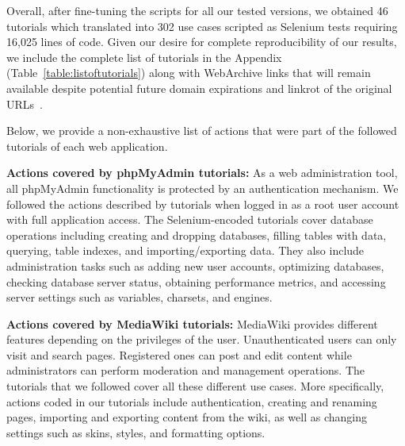 Overall, after fine-tuning the scripts for all our tested versions, we obtained
46 tutorials which translated into 302 use cases scripted as Selenium tests
requiring 16,025 lines of code. Given our desire for complete reproducibility
of our results, we include the complete list of tutorials in the Appendix
(Table~\ref{table:listoftutorials}) along with WebArchive links that will
remain available despite potential future domain expirations and linkrot of
the original URLs~\cite{koehler2004longitudinal}.


Below, we provide a non-exhaustive list of actions that were part of the followed tutorials of each web application. 
\vspace{0.5ex}

\noindent \textbf{Actions covered by phpMyAdmin tutorials:} As a web administration tool, all phpMyAdmin functionality is protected by an authentication mechanism.
We followed the actions described by tutorials when logged in as a root user account with full application access. The Selenium-encoded tutorials cover database operations including creating and dropping databases, filling tables with data, querying, table indexes, and importing/exporting data.
They also include administration tasks such as adding new user accounts, optimizing databases, checking database server status, obtaining performance metrics, and accessing server settings such as variables, charsets, and engines.

\vspace{0.5ex}

\noindent \textbf{Actions covered by MediaWiki tutorials:} MediaWiki provides different features depending on the privileges of the user.
Unauthenticated users can only visit and search pages.
Registered ones can post and edit content while administrators can perform moderation and management operations.
The tutorials that we followed cover all these different use cases.
More specifically, actions coded in our tutorials include authentication, creating and renaming pages, importing and exporting content from the wiki, as well as changing settings such as skins, styles, and formatting options.

